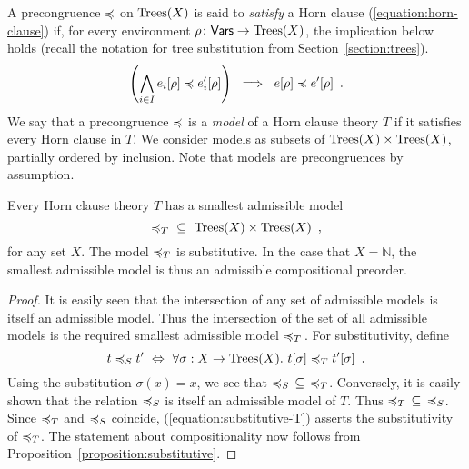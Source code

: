 A precongruence $\preccurlyeq$ on $\textnormal{Trees}(X)$ is said to \emph{satisfy} a Horn clause (\ref{equation:horn-clause}) if,
for every environment $\rho \colon \mathsf{Vars} \to \textnormal{Trees}(X)$, the implication below holds (recall the notation for tree substitution from Section~\ref{section:trees}).
\[
\left( \bigwedge_{i \in I} e_i[\rho] \preccurlyeq e'_i[\rho] \right) ~ \implies ~  e[\rho] \preccurlyeq e'[\rho] \enspace .
\]
We say that a precongruence $\preccurlyeq$ is a \emph{model} of a Horn clause theory $T$ if it satisfies every Horn clause in $T$.
We consider models as subsets of $\textnormal{Trees}(X) \times \textnormal{Trees}(X)$, partially ordered by inclusion. Note that models are precongruences by assumption.
\begin{proposition}
\label{proposition:axiomatic}
Every Horn clause theory $T$ has a smallest admissible model  
\[{\preccurlyeq_T} ~\subseteq~ \textnormal{Trees}(X) \times \textnormal{Trees}(X) \enspace ,\]
for any set $X$. The model ${\preccurlyeq_T}$
is substitutive. In the case that $X = \mathbb{N}$, the smallest admissible model is thus an
admissible compositional preorder.
\end{proposition}
\begin{proof}
It is easily seen that the intersection of any set of admissible models is itself an admissible model.
Thus the
intersection of the set of all admissible models is the required smallest admissible model $\preccurlyeq_T\,$. For substitutivity, 
define 
\begin{equation}
\label{equation:substitutive-T}
t \preccurlyeq_S t' ~ \Leftrightarrow ~ \forall \sigma : X \to \textnormal{Trees}(X). ~ t[\sigma] \preccurlyeq_T t'[\sigma] \enspace .
\end{equation}
Using the substitution $\sigma(x) = x$, we see that ${\preccurlyeq_S}\, \subseteq\, {\preccurlyeq_T}$.
Conversely, it is easily shown that the relation $\preccurlyeq_S$ is itself an admissible model of $T$. 
Thus ${\preccurlyeq_T}\, \subseteq\, {\preccurlyeq_S}$. Since ${\preccurlyeq_T}$ and ${\preccurlyeq_S}$ coincide,
(\ref{equation:substitutive-T}) asserts the substitutivity of ${\preccurlyeq_T}$.
The statement about compositionality now follows from Proposition~\ref{proposition:substitutive}.
\end{proof}


